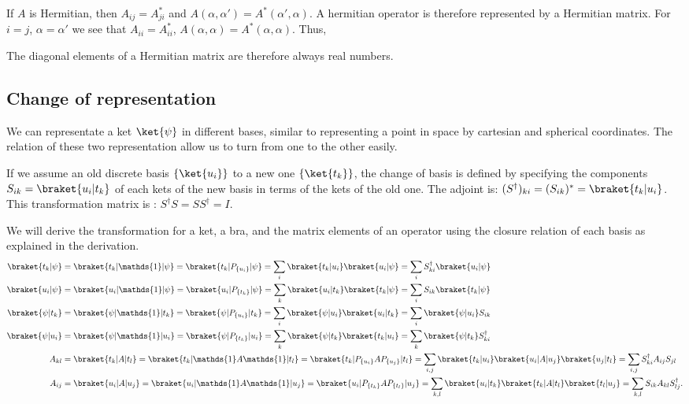 If $A$ is Hermitian, then $A_{ij}=A^*_{ji}$ and $A(\alpha,\alpha')=A^*(\alpha',\alpha)$. A hermitian operator is therefore represented by a Hermitian matrix.
For $i=j$, $\alpha=\alpha'$ we see that $A_{ii}=A_{ii}^*$, $A(\alpha,\alpha)=A^*(\alpha,\alpha)$. Thus,
\begin{emphasizer}
    The diagonal elements of a Hermitian matrix are therefore always real numbers.
\end{emphasizer}
\subsection{Change of representation}

We can representate a ket $\ket{\psi}$ in different bases, similar to representing a point in space by cartesian and spherical coordinates. 
The relation of these two representation allow us to turn from one to the other easily.

If we assume an old discrete basis $\{\ket{u_i}\}$ to a new one $\{\ket{t_k}\}$, the change of basis is defined by specifying the components $S_{ik}=\braket{u_i|t_k}$ of each 
kets of the new basis in terms of the kets of the old one. The adjoint is: $(S^\dagger)_{ki}=(S_{ik})^*=\braket{t_k|u_i}$. This transformation matrix is : $S^\dagger S=SS^\dagger=I$.


We will derive the transformation for a ket, a bra, and the matrix elements of an operator using the closure relation of each basis as explained in the derivation. 
\begin{align*}
    \braket{t_k|\psi}&=\braket{t_k|\mathds{1}|\psi}=\braket{t_k|P_{\{u_i\}}|\psi}=\sum_i\braket{t_k|u_i}\braket{u_i|\psi}=\sum_iS^\dagger_{ki}\braket{u_i|\psi}\\
    \braket{u_i|\psi}&=\braket{u_i|\mathds{1}|\psi}=\braket{u_i|P_{\{t_k\}}|\psi}=\sum_k\braket{u_i|t_k}\braket{t_k|\psi}=\sum_iS_{ik}\braket{t_k|\psi}\\
    \braket{\psi|t_k}&=\braket{\psi|\mathds{1}|t_k}=\braket{\psi|P_{\{u_i\}}|t_k}=\sum_i\braket{\psi|u_i}\braket{u_i|t_k}=\sum_i\braket{\psi|u_i}S_{ik}\\
    \braket{\psi|u_i}&=\braket{\psi|\mathds{1}|u_i}=\braket{\psi|P_{\{t_k\}}|u_i}=\sum_k\braket{\psi|t_k}\braket{t_k|u_i}=\sum_k\braket{\psi|t_k}S^\dagger_{ki}\\
        A_{kl}&=\braket{t_k|A|t_l}=\braket{t_k|\mathds{1}A\mathds{1}|t_l}=\braket{t_k|P_{\{u_i\}}AP_{\{u_j\}}|t_l}=\sum_{i,j}\braket{t_k|u_i}\braket{u_i|A|u_j}\braket{u_j|t_l}=\sum_{i,j}S^\dagger_{ki}A_{ij}S_{jl}\\
    A_{ij}&=\braket{u_i|A|u_j}=\braket{u_i|\mathds{1}A\mathds{1}|u_j}=\braket{u_i|P_{\{t_k\}}AP_{\{t_l\}}|u_j}=\sum_{k,l}\braket{u_i|t_k}\braket{t_k|A|t_l}\braket{t_l|u_j}=\sum_{k,l}S_{ik}A_{kl}S^\dagger_{lj}.
\end{align*}

